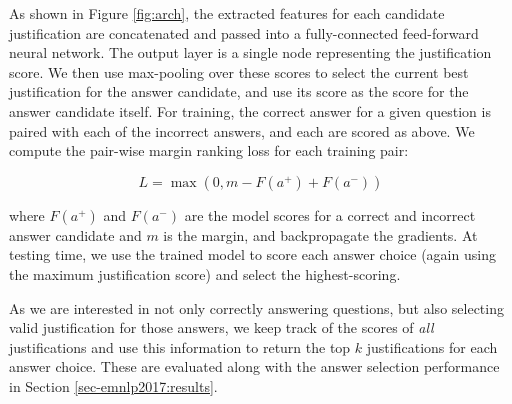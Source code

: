 As shown in Figure \ref{fig:arch}, the extracted features for each candidate justification are concatenated and passed into a fully-connected feed-forward neural network.  The output layer is a single node representing the justification score.  We then use max-pooling over these scores to select the current best justification for the answer candidate, and use its score as the score for the answer candidate itself.  For training, the correct answer for a given question is paired with each of the incorrect answers, and each are scored as above.  We compute the pair-wise margin ranking loss for each training pair:

\begin{equation}
L = \max(0, m - F(a^{+}) + F(a^{-}))
\end{equation}

where $F(a^+)$ and $F(a^-)$ are the model scores for a correct and incorrect answer candidate and $m$ is the margin, and backpropagate the gradients.
At testing time, we use the trained model to score each answer choice (again using the maximum justification score) and select the highest-scoring.

As we are interested in not only correctly answering questions, but also selecting valid justification for those answers, we keep track of the scores of \emph{all} justifications and use this information to return the top $k$ justifications for each answer choice.  These are evaluated along with the answer selection performance in Section \ref{sec-emnlp2017:results}.
